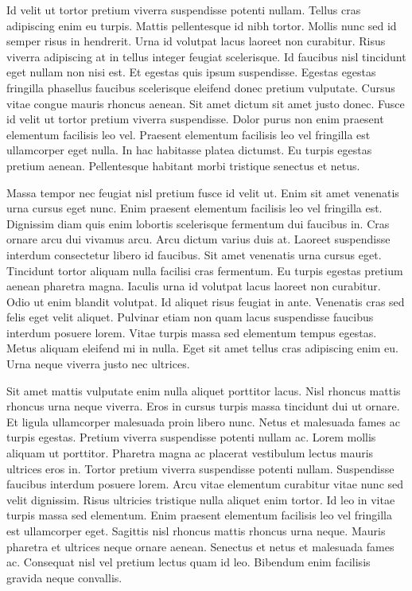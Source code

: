\documentclass[11pt,a4paper]{article}
\begin{document}
Id velit ut tortor pretium viverra suspendisse potenti nullam. Tellus cras adipiscing enim eu turpis. Mattis pellentesque id nibh tortor. Mollis nunc sed id semper risus in hendrerit. Urna id volutpat lacus laoreet non curabitur. Risus viverra adipiscing at in tellus integer feugiat scelerisque. Id faucibus nisl tincidunt eget nullam non nisi est. Et egestas quis ipsum suspendisse. Egestas egestas fringilla phasellus faucibus scelerisque eleifend donec pretium vulputate. Cursus vitae congue mauris rhoncus aenean. Sit amet dictum sit amet justo donec. Fusce id velit ut tortor pretium viverra suspendisse. Dolor purus non enim praesent elementum facilisis leo vel. Praesent elementum facilisis leo vel fringilla est ullamcorper eget nulla. In hac habitasse platea dictumst. Eu turpis egestas pretium aenean. Pellentesque habitant morbi tristique senectus et netus.

Massa tempor nec feugiat nisl pretium fusce id velit ut. Enim sit amet venenatis urna cursus eget nunc. Enim praesent elementum facilisis leo vel fringilla est. Dignissim diam quis enim lobortis scelerisque fermentum dui faucibus in. Cras ornare arcu dui vivamus arcu. Arcu dictum varius duis at. Laoreet suspendisse interdum consectetur libero id faucibus. Sit amet venenatis urna cursus eget. Tincidunt tortor aliquam nulla facilisi cras fermentum. Eu turpis egestas pretium aenean pharetra magna. Iaculis urna id volutpat lacus laoreet non curabitur. Odio ut enim blandit volutpat. Id aliquet risus feugiat in ante. Venenatis cras sed felis eget velit aliquet. Pulvinar etiam non quam lacus suspendisse faucibus interdum posuere lorem. Vitae turpis massa sed elementum tempus egestas. Metus aliquam eleifend mi in nulla. Eget sit amet tellus cras adipiscing enim eu. Urna neque viverra justo nec ultrices.

Sit amet mattis vulputate enim nulla aliquet porttitor lacus. Nisl rhoncus mattis rhoncus urna neque viverra. Eros in cursus turpis massa tincidunt dui ut ornare. Et ligula ullamcorper malesuada proin libero nunc. Netus et malesuada fames ac turpis egestas. Pretium viverra suspendisse potenti nullam ac. Lorem mollis aliquam ut porttitor. Pharetra magna ac placerat vestibulum lectus mauris ultrices eros in. Tortor pretium viverra suspendisse potenti nullam. Suspendisse faucibus interdum posuere lorem. Arcu vitae elementum curabitur vitae nunc sed velit dignissim. Risus ultricies tristique nulla aliquet enim tortor. Id leo in vitae turpis massa sed elementum. Enim praesent elementum facilisis leo vel fringilla est ullamcorper eget. Sagittis nisl rhoncus mattis rhoncus urna neque. Mauris pharetra et ultrices neque ornare aenean. Senectus et netus et malesuada fames ac. Consequat nisl vel pretium lectus quam id leo. Bibendum enim facilisis gravida neque convallis.
\end{document}
